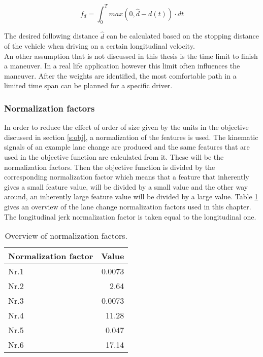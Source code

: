 \begin{equation}\label{eq:lane_d}
f_d= \int_{0}^{T} max(0,\hat{d}-d(t))\cdot dt
\end{equation}


The desired following distance $\hat{d}$ can be calculated based on the stopping distance of the vehicle when driving on a certain longitudinal velocity. \\

An other assumption that is not discussed in this thesis is the time limit to finish a maneuver. In a real life application however this limit often influences the maneuver. After the weights are identified, the most comfortable path in a limited time span can be planned for a specific driver. 

\subsubsection{Normalization factors} \label{s:norm}
In order to reduce the effect of order of size given by the units in the objective discussed in section \ref{s:obj}, a normalization of the features is used. The kinematic signals of an example lane change are produced and the same features that are used in the objective function are calculated from it. These will be the normalization factors. Then the objective function is divided by the corresponding normalization factor which means that a feature that inherently gives a small feature value, will be divided by a small value and the other way around, an inherently large feature value will be divided by a large value. Table \ref{table:norm} gives an overview of the lane change normalization factors used in this chapter. The longitudinal jerk normalization factor is taken equal to the longitudinal one.


\begin{table}[h!]
  \centering
  \begin{tabular}{@{}lr@{}} 
    Normalization factor    & Value\\ \midrule
    Nr.1      & 0.0073\\
    Nr.2          & 2.64\\
    Nr.3 	   & 0.0073\\
    Nr.4       & 11.28\\
    Nr.5       & 0.047\\
    Nr.6  & 17.14\\ \bottomrule
  \end{tabular}
	\label{table:norm}
  \caption{Overview of  normalization factors.}
\end{table}


